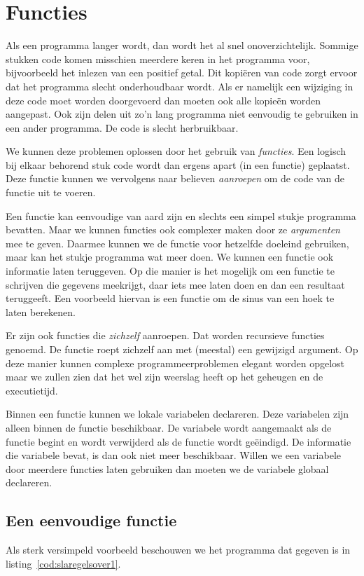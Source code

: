 \chapter{Functies}
\label{cha:functies}
\thispagestyle{empty}

Als een programma langer wordt, dan wordt het al snel onoverzichtelijk. Sommige stukken code komen misschien meerdere keren in het programma voor, bijvoorbeeld het inlezen van een positief getal. Dit kopiëren van code zorgt ervoor dat het programma slecht onderhoudbaar wordt. Als er namelijk een wijziging in deze code moet worden doorgevoerd dan moeten ook alle kopieën worden aangepast. Ook zijn delen uit zo'n lang programma niet eenvoudig te gebruiken in een ander programma. De code is slecht herbruikbaar.

We kunnen deze problemen oplossen door het gebruik van \textsl{functies}. Een logisch bij elkaar behorend stuk code wordt dan ergens apart (in een functie) geplaatst. Deze functie kunnen we vervolgens naar believen \textsl{aanroepen} om de code van de functie uit te voeren.

Een functie kan eenvoudige van aard zijn en slechts een simpel stukje programma bevatten. Maar we kunnen functies ook complexer maken door ze \textsl{argumenten} mee te geven. Daarmee kunnen we de functie voor hetzelfde doeleind gebruiken, maar kan het stukje programma wat meer doen. We kunnen een functie ook informatie laten teruggeven. Op die manier is het mogelijk om een functie te schrijven die gegevens meekrijgt, daar iets mee laten doen en dan een resultaat teruggeeft. Een voorbeeld hiervan is een functie om de sinus van een hoek te laten berekenen.

Er zijn ook functies die \textsl{zichzelf} aanroepen. Dat worden recursieve functies genoemd. De functie roept zichzelf aan met (meestal) een gewijzigd argument. Op deze manier kunnen complexe programmeerproblemen elegant worden opgelost maar we zullen zien dat het wel zijn weerslag heeft op het geheugen en de executietijd.

Binnen een functie kunnen we lokale variabelen declareren. Deze variabelen zijn alleen binnen de functie beschikbaar. De variabele wordt aangemaakt als de functie begint en wordt verwijderd als de functie wordt geëindigd. De informatie die variabele bevat, is dan ook niet meer beschikbaar. Willen we een variabele door meerdere functies laten gebruiken dan moeten we de variabele globaal declareren.


\section{Een eenvoudige functie}
Als sterk versimpeld voorbeeld beschouwen we het programma dat gegeven is in listing~\ref{cod:slaregelsover1}.


